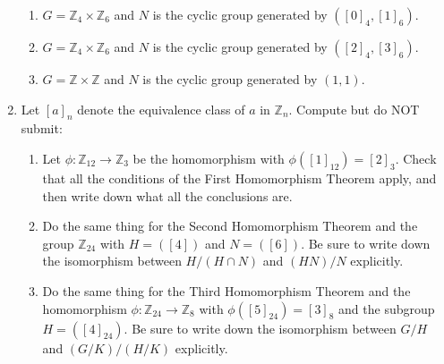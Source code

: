 \documentclass[11pt]{article}
\newcommand{\Z}{\mathbb{Z}}
\begin{document}
\begin{enumerate}
\begin{enumerate}
\item $G = \Z_4 \times \Z_6$ and 
$N$ is the cyclic group generated by $([0]_4,[1]_6)$.
\item $G = \Z_4 \times \Z_6$ and 
$N$ is the cyclic group generated by $([2]_4,[3]_6)$.
\item $G = \Z \times \Z$ and 
$N$ is the cyclic group generated by $(1,1)$.
\end{enumerate}


\item Let $[a]_n$ denote the equivalence class of $a$ in $\Z_n$.
Compute but do NOT submit:

\begin{enumerate}
\item Let $\phi: \Z_{12} \rightarrow \Z_3$ be the homomorphism 
with $\phi([1]_{12}) = [2]_3$.
Check that all the conditions of the First Homomorphism Theorem apply,
and then write down what all the conclusions are.

\item Do the same thing for the Second Homomorphism Theorem and 
the group $\Z_{24}$ with $H = ([4])$ and $N = ([6])$.
Be sure to write down the isomorphism between $H/(H \cap N)$ and $(HN)/N$
explicitly.

\item Do the same thing for the Third Homomorphism Theorem and 
the homomorphism $\phi: \Z_{24} \rightarrow \Z_8$ with 
$\phi([5]_{24}) = [3]_8$ and the subgroup $H = ([4]_{24})$. 
Be sure to write down the isomorphism between $G/H$ and $(G/K)/(H/K)$
explicitly.

\end{enumerate}

\end{enumerate}
\end{document}
